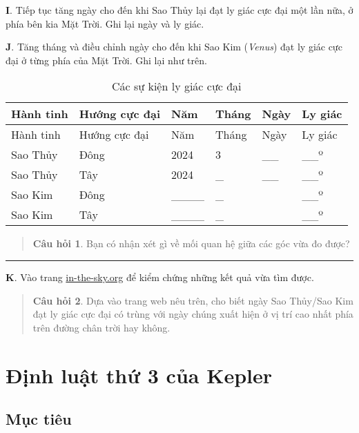 \documentclass[
  a4paper,
]{book}
\begin{document}
\textbf{I}. Tiếp tục tăng ngày cho đến khi Sao Thủy lại đạt ly giác cực đại một lần nữa, ở phía bên kia Mặt Trời. Ghi lại ngày và ly giác.

\textbf{J}. Tăng tháng và điều chỉnh ngày cho đến khi Sao Kim (\emph{Venus}) đạt ly giác cực đại ở từng phía của Mặt Trời. Ghi lại như trên.

\begin{longtable}[]{@{}llllll@{}}
\caption{\label{tab:elongation} Các sự kiện ly giác cực đại}\tabularnewline
\toprule\noalign{}
Hành tinh & Hướng cực đại & Năm & Tháng & Ngày & Ly giác \\
\midrule\noalign{}
\endfirsthead
\toprule\noalign{}
Hành tinh & Hướng cực đại & Năm & Tháng & Ngày & Ly giác \\
\midrule\noalign{}
\endhead
\bottomrule\noalign{}
\endlastfoot
Sao Thủy & Đông & 2024 & 3 & \_\_ & \_\_º \\
Sao Thủy & Tây & 2024 & \_ & \_\_ & \_\_º \\
Sao Kim & Đông & \_\_\_\_ & \_ & & \_\_º \\
Sao Kim & Tây & \_\_\_\_ & \_ & & \_\_º \\
\end{longtable}

\begin{quote}
\textbf{Câu hỏi 1}. Bạn có nhận xét gì về mối quan hệ giữa các góc vừa đo được?
\end{quote}

\begin{center}\rule{0.5\linewidth}{0.5pt}\end{center}

\textbf{K}. Vào trang \href{https://in-the-sky.org/newsindex.php?feed=innerplanets&year=2024&month=3&day=10&town=1568574}{in-the-sky.org} để kiểm chứng những kết quả vừa tìm được.

\begin{quote}
\textbf{Câu hỏi 2}. Dựa vào trang web nêu trên, cho biết ngày Sao Thủy/Sao Kim đạt ly giác cực đại có trùng với ngày chúng xuất hiện ở vị trí cao nhất phía trên đường chân trời hay không.
\end{quote}

\chapter{Định luật thứ 3 của Kepler}\label{ux111ux1ecbnh-luux1eadt-thux1ee9-3-cux1ee7a-kepler}

\section{Mục tiêu}\label{mux1ee5c-tiuxeau-2}
\end{document}
